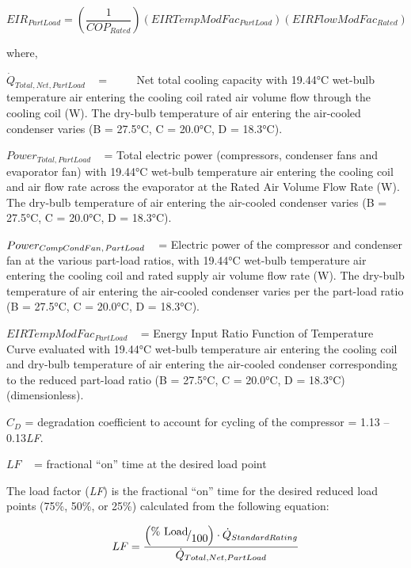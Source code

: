 \begin{equation}
EI{R_{PartLoad}} = \left( {\frac{1}{{CO{P_{Rated}}}}} \right)(EIRTempModFa{c_{PartLoad}})(EIRFlowModFa{c_{Rated}})
\end{equation}

where,

\({\dot Q_{Total,Net,PartLoad}}\) ~ = ~~~~ Net total cooling capacity with 19.44°C wet-bulb temperature air entering the cooling coil rated air volume flow through the cooling coil (W). The dry-bulb temperature of air entering the air-cooled condenser varies (B = 27.5°C, C = 20.0°C, D = 18.3°C).

\(Powe{r_{Total,PartLoad}}\) ~ = Total electric power (compressors, condenser fans and evaporator fan) with 19.44°C wet-bulb temperature air entering the cooling coil and air flow rate across the evaporator at the Rated Air Volume Flow Rate (W). The dry-bulb temperature of air entering the air-cooled condenser varies (B = 27.5°C, C = 20.0°C, D = 18.3°C).

\(Powe{r_{CompCondFan,{\kern 1pt} PartLoad}}\) ~ = Electric power of the compressor and condenser fan at the various part-load ratios, with 19.44°C wet-bulb temperature air entering the cooling coil and rated supply air volume flow rate (W). The dry-bulb temperature of air entering the air-cooled condenser varies per the part-load ratio (B = 27.5°C, C = 20.0°C, D = 18.3°C).

\(EIRTempModFa{c_{PartLoad}}\) ~ = Energy Input Ratio Function of Temperature Curve evaluated with 19.44°C wet-bulb temperature air entering the cooling coil and dry-bulb temperature of air entering the air-cooled condenser corresponding to the reduced part-load ratio (B = 27.5°C, C = 20.0°C, D = 18.3°C) (dimensionless).

\({C_D}\) = degradation coefficient to account for cycling of the compressor = 1.13 -- 0.13\emph{LF}.

\(LF\) ~ = fractional ``on'' time at the desired load point

The load factor (\emph{LF}) is the fractional ``on'' time for the desired reduced load points (75\%, 50\%, or 25\%) calculated from the following equation:

\begin{equation}
LF = \frac{{\left( {{\raise0.7ex\hbox{{\% Load}} \!\mathord{\left/ {\vphantom {{\% Load} {100}}}\right.}\!\lower0.7ex\hbox{{100}}}} \right) \cdot {{\dot Q}_{StandardRating}}}}{{{{\dot Q}_{Total,Net,PartLoad}}}}
\end{equation}

